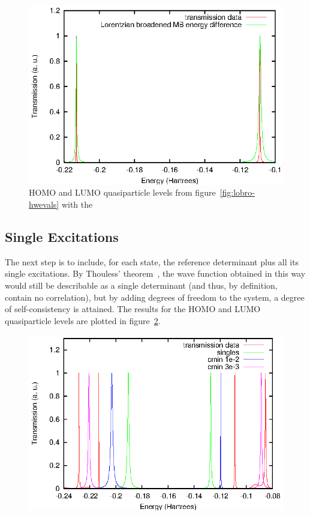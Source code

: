 \begin{figure}
	\begin{center}
		\includegraphics[width=0.9\linewidth]{figures/nobranch}
	\end{center}
	\caption{\ac{HOMO} and \ac{LUMO} quasiparticle levels from
	figure~\ref{fig:lobro-hwevals} with the }
	\label{fig:nobranch}
\end{figure}

\subsection{Single Excitations}
\label{subsec:singles}

The next step is to include, for each state, the reference determinant plus all
its single excitations. By Thouless' theorem~\cite{Thouless}, the wave function
obtained in this way would still be describable as a single determinant (and
thus, by definition, contain no correlation), but by adding degrees of freedom
to the system, a degree of self-consistency is attained. The results for the
\ac{HOMO} and \ac{LUMO} quasiparticle levels are plotted in
figure~\ref{fig:cipeaks}.

\begin{figure}
	\begin{center}
		\includegraphics[width=0.9\linewidth]{figures/cipeaks}
	\end{center}
	\caption{}
	\label{fig:cipeaks}
\end{figure}

